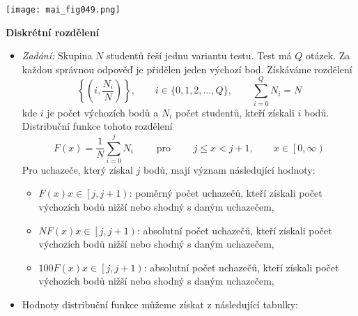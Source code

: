 \begin{example}
  {\centering
   \captionsetup{type=figure}
   \texttt{[image: mai\_fig049.png]}
  \par}
  
  \textbf{Diskrétní rozdělení}
    \begin{itemize}
      \item \emph{Zadání:} Skupina \(N\) studentů řeší jednu variantu testu. Test má \(Q\) otázek. 
            Za každou správnou odpověď je přidělen jeden výchozí bod. Získáváme rozdělení
            \begin{equation*}
              \left\lbrace\left(i, \dfrac{N_i}{N} \right)\right\rbrace, \qquad
              i\in\lbrace0, 1, 2, \ldots, Q\rbrace, \qquad
              \sum_{i=0}^{Q}N_i = N 
            \end{equation*}
            kde \(i\) je počet výchozích bodů a \(N_i\) počet studentů, kteří získali \(i\) bodů. 
            Distribuční funkce tohoto rozdělení
            \begin{equation*}
              F(x) = \dfrac{1}{N}\sum_{i=0}^{j}N_i\qquad\text{ pro }\qquad
              j\leq x < j+1, \qquad x\in\left[0,\infty\right)
            \end{equation*}
            Pro uchazeče, který získal \(j\) bodů, mají význam následující hodnoty:
            \begin{itemize}
              \item \(F(x)    x \in \left[j, j+1\right)\): poměrný počet uchazečů, kteří 
                    získali počet výchozích bodů nižší nebo shodný s daným uchazečem,
              \item \(NF(x)   x \in \left[j, j+1\right)\): absolutní počet uchazečů, kteří získali 
                    počet výchozích bodů nižší nebo shodný s daným uchazečem,
              \item \(100F(x) x \in \left[j, j+1\right)\): absolutní počet uchazečů, kteří získali 
                    počet výchozích bodů nižší nebo shodný s daným uchazečem,
            \end{itemize}
      \item Hodnoty distribuční funkce můžeme získat z následující tabulky:
            \begin{table}[ht!]
              \centering
\end{table}
\end{itemize}
\end{example}
